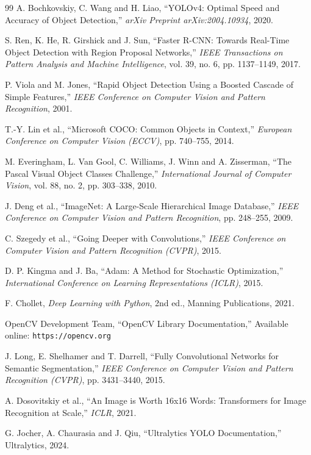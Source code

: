 \begin{thebibliography}{99}
A. Bochkovskiy, C. Wang and H. Liao,
``YOLOv4: Optimal Speed and Accuracy of Object Detection,''
\textit{arXiv Preprint arXiv:2004.10934}, 2020.

S. Ren, K. He, R. Girshick and J. Sun,
``Faster R-CNN: Towards Real-Time Object Detection with Region Proposal Networks,''
\textit{IEEE Transactions on Pattern Analysis and Machine Intelligence},
vol. 39, no. 6, pp. 1137--1149, 2017.

P. Viola and M. Jones,
``Rapid Object Detection Using a Boosted Cascade of Simple Features,''
\textit{IEEE Conference on Computer Vision and Pattern Recognition}, 2001.

T.-Y. Lin et al.,
``Microsoft COCO: Common Objects in Context,''
\textit{European Conference on Computer Vision (ECCV)},
pp. 740--755, 2014.

M. Everingham, L. Van Gool, C. Williams, J. Winn and A. Zisserman,
``The Pascal Visual Object Classes Challenge,''
\textit{International Journal of Computer Vision},
vol. 88, no. 2, pp. 303--338, 2010.

J. Deng et al.,
``ImageNet: A Large-Scale Hierarchical Image Database,''
\textit{IEEE Conference on Computer Vision and Pattern Recognition},
pp. 248--255, 2009.

C. Szegedy et al.,
``Going Deeper with Convolutions,''
\textit{IEEE Conference on Computer Vision and Pattern Recognition (CVPR)},
2015.

D. P. Kingma and J. Ba,
``Adam: A Method for Stochastic Optimization,''
\textit{International Conference on Learning Representations (ICLR)},
2015.

F. Chollet,
\textit{Deep Learning with Python},
2nd ed., Manning Publications, 2021.

OpenCV Development Team,
``OpenCV Library Documentation,''
Available online: \texttt{https://opencv.org}

J. Long, E. Shelhamer and T. Darrell,
``Fully Convolutional Networks for Semantic Segmentation,''
\textit{IEEE Conference on Computer Vision and Pattern Recognition (CVPR)},
pp. 3431--3440, 2015.

A. Dosovitskiy et al.,
``An Image is Worth 16x16 Words: Transformers for Image Recognition at Scale,''
\textit{ICLR}, 2021.

G. Jocher, A. Chaurasia and J. Qiu,
``Ultralytics YOLO Documentation,''
Ultralytics, 2024.


\end{thebibliography}
